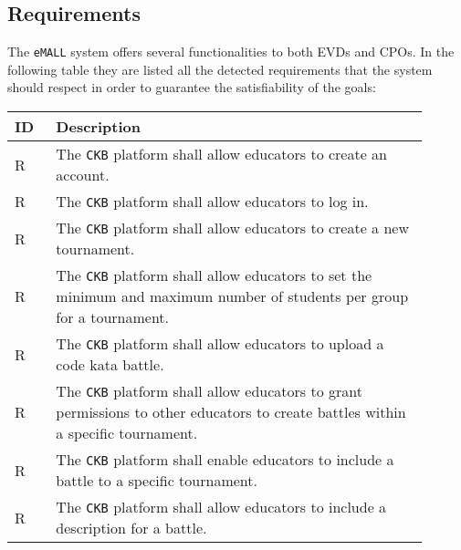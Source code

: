 \subsection{Requirements}
\label{subsec: requirements}%
The \verb|eMALL| system offers several functionalities to both EVDs and CPOs.
In the following table they are listed all the detected requirements that the system should respect in order to guarantee
the satisfiability of the goals:
\newpage
{}
\setcounter{req}{1}
\newcommand{\creq}{\thereq\stepcounter{req}}
\begin{center}
    \begin{longtable}{|l|p{0.9\linewidth}|}
        \hline
        \textbf{ID} & \textbf{Description}                                                                                                                             \\
        \hline
        R\creq      & The \verb|CKB| platform shall allow educators to create an account.                                                                    \\
        \hline
        R\creq      & The \verb|CKB| platform shall allow educators to log in.                                                                                 \\
        \hline
        R\creq      & The \verb|CKB| platform shall allow educators to create a new tournament.                                                                \\
        \hline
        R\creq      & The \verb|CKB| platform shall allow educators to set the minimum and maximum number of students per group for a tournament.                                                        \\
        \hline
        R\creq      & The \verb|CKB| platform shall allow educators to upload a code kata battle.                                                                         \\
        \hline
        R\creq      & The \verb|CKB| platform shall allow educators to grant permissions to other educators to create battles within a specific tournament.                                                      \\
        \hline
        R\creq      & The \verb|CKB| platform shall enable educators to include a battle to a specific tournament.                                                      \\
        \hline
        R\creq      & The \verb|CKB| platform shall allow educators to include a description for a battle.                                                                \\

\end{longtable}
\end{center}
